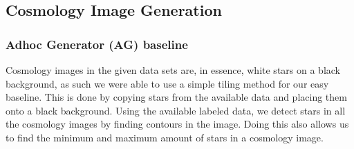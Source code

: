 \documentclass[10pt,conference,compsocconf]{IEEEtran}
\begin{document}




\subsection{Cosmology Image Generation}

\subsubsection{Adhoc Generator (AG) baseline} 
\label{subsubsec: adhoc} %
Cosmology images in the given data sets are, in essence, white stars on a black background, as such we were able to use a simple tiling method for our easy baseline. This is done by copying stars from the available data and placing them onto a black background. Using the available labeled data, we detect stars in all the cosmology images by finding contours in the image. Doing this also allows us to find the minimum and maximum amount of stars in a cosmology image.
\end{document}
